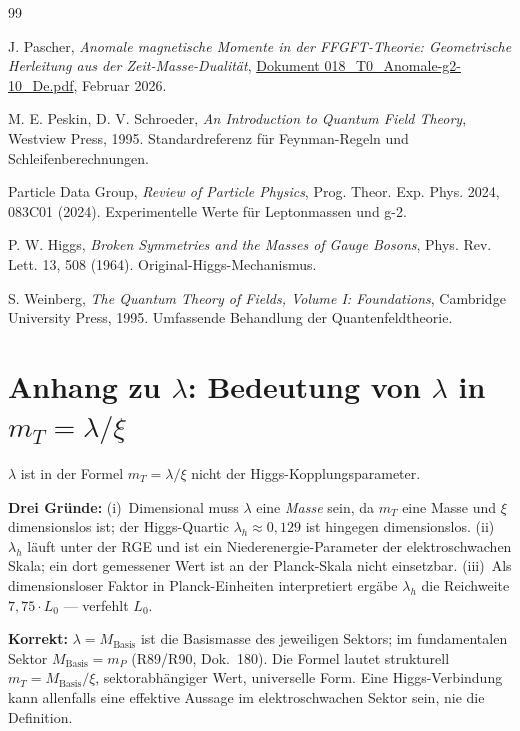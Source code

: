	\begin{thebibliography}{99}
		
		J. Pascher,
		\textit{Anomale magnetische Momente in der FFGFT-Theorie: Geometrische Herleitung aus der Zeit-Masse-Dualität},
		\href{https://github.com/jpascher/T0-Time-Mass-Duality/blob/main/2/pdf/018_T0_Anomale-g2-10_De.pdf}{Dokument 018\_T0\_Anomale-g2-10\_De.pdf},
		Februar 2026.
		
		M. E. Peskin, D. V. Schroeder,
		\textit{An Introduction to Quantum Field Theory},
		Westview Press, 1995.
		Standardreferenz für Feynman-Regeln und Schleifenberechnungen.
		
		Particle Data Group,
		\textit{Review of Particle Physics},
		Prog. Theor. Exp. Phys. 2024, 083C01 (2024).
		Experimentelle Werte für Leptonmassen und g-2.
		
		P. W. Higgs,
		\textit{Broken Symmetries and the Masses of Gauge Bosons},
		Phys. Rev. Lett. 13, 508 (1964).
		Original-Higgs-Mechanismus.
		
		S. Weinberg,
		\textit{The Quantum Theory of Fields, Volume I: Foundations},
		Cambridge University Press, 1995.
		Umfassende Behandlung der Quantenfeldtheorie.
		
	\end{thebibliography}
	
\section*{Anhang zu $\lambda$: Bedeutung von $\lambda$ in $m_T = \lambda/\xi$}

$\lambda$ ist in der Formel $m_T = \lambda/\xi$ nicht der Higgs-Kopplungsparameter.

\textbf{Drei Gründe:}
(i)~Dimensional muss $\lambda$ eine \emph{Masse} sein, da $m_T$ eine Masse
und $\xi$ dimensionslos ist; der Higgs-Quartic $\lambda_h \approx 0{,}129$
ist hingegen dimensionslos.
(ii)~$\lambda_h$ läuft unter der RGE und ist ein Niederenergie-Parameter
der elektroschwachen Skala; ein dort gemessener Wert ist an der Planck-Skala
nicht einsetzbar.
(iii)~Als dimensionsloser Faktor in Planck-Einheiten interpretiert ergäbe
$\lambda_h$ die Reichweite $7{,}75\cdot L_0$ --- verfehlt $L_0$.

\textbf{Korrekt:} $\lambda = M_\text{Basis}$ ist die Basismasse des jeweiligen
Sektors; im fundamentalen Sektor $M_\text{Basis} = m_P$ (R89/R90, Dok.~180).
Die Formel lautet strukturell $m_T = M_\text{Basis}/\xi$, sektorabhängiger Wert,
universelle Form. Eine Higgs-Verbindung kann allenfalls eine effektive Aussage im
elektroschwachen Sektor sein, nie die Definition.
